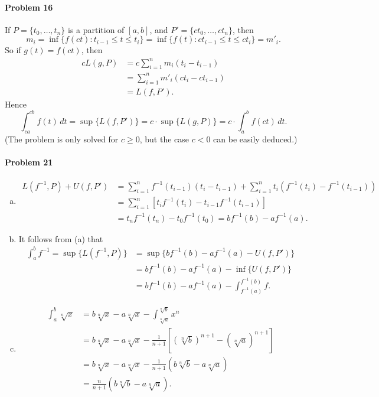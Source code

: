 \documentclass{article}
\begin{document}
\paragraph{Problem 16} If $P = \{t_0, \ldots, t_n\}$ is a partition of $[a,
b]$, and $P' = \{ct_0, \ldots, ct_n\}$, then \[
  m_i
  = \inf\{f(ct): t_{i-1} \leq t \leq t_i\}
  = \inf\{f(t): ct_{i-1} \leq t \leq ct_i\} = m'_i.
\] So if $g(t) = f(ct)$, then
\begin{align*}
  cL(g, P) &= c\sum_{i=1}^n m_i(t_i - t_{i-1}) \\
           &= \sum_{i=1}^n m'_i(ct_i - ct_{i-1}) \\
           &= L(f, P').
\end{align*}
Hence \[
  \int_{ca}^{cb} f(t) \,dt
  = \sup\{L(f, P')\}
  = c \cdot \sup\{L(g, P)\}
  = c \cdot \int_a^b f(ct) \,dt.
\] (The problem is only solved for $c \geq 0$, but the case $c < 0$ can be
easily deduced.)

\paragraph{Problem 21}
\begin{enumerate}[(a)]
  \item
    \begin{align*}
      L(f^{-1}, P) + U(f, P')
      &= \sum_{i=1}^n f^{-1}(t_{i-1})(t_i - t_{i-1})
      + \sum_{i=1}^n t_i(f^{-1}(t_i) - f^{-1}(t_{i-1})) \\
      &= \sum_{i=1}^n [t_if^{-1}(t_i) - t_{i-1}f^{-1}(t_{i-1})] \\
      &= t_nf^{-1}(t_n) - t_0f^{-1}(t_0) = bf^{-1}(b) - af^{-1}(a).
    \end{align*}
  \item It follows from (a) that
    \begin{align*}
      \int_a^b f^{-1} = \sup\{L(f^{-1}, P)\}
      &= \sup\{bf^{-1}(b) - af^{-1}(a) - U(f, P')\} \\
      &= bf^{-1}(b) - af^{-1}(a) - \inf\{U(f, P')\} \\
      &= bf^{-1}(b) - af^{-1}(a) - \int_{f^{-1}(a)}^{f^{-1}(b)} f.
    \end{align*}
  \item
    \begin{align*}
      \int_a^b \sqrt[n]{x}
      &= b\sqrt[n]{x} - a\sqrt[n]{x} - \int_{\sqrt[n]{a}}^{\sqrt[n]{b}} x^n \\
      &= b\sqrt[n]{x} - a\sqrt[n]{x} - \frac{1}{n+1}[(\sqrt[n]{b})^{n+1} -
      (\sqrt[n]{a})^{n+1}] \\
      &= b\sqrt[n]{x} - a\sqrt[n]{x} - \frac{1}{n+1}(b\sqrt[n]{b} -
      a\sqrt[n]{a}) \\
      &= \frac{n}{n+1}(b\sqrt[n]{b} - a\sqrt[n]{a}).
    \end{align*}
\end{enumerate}
\end{document}
